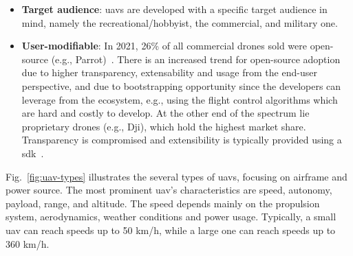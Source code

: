 \begin{itemize}
  fuel, or a hybrid solution. Except for the fuel-only powered ones (e.g., Nitro
  Stingray, and Goliath Quadcopter~\cite{gasPoweredDrone}), all the
  others use electric motors. These motors can be powered through batteries
  (e.g., Parrot\cite{parrotDrone}, Dji Mavic 3~\cite{djiMavic3Drone}),
  typically \gls{lipo}, \glspl{hfc} (e.g., Energyor H2Quad 1000~\cite{energyorDrone}), and solar power. The
  hybrid solutions use fuel + batteries (e.g., Flaperon MX8~\cite{flaperonDrone}) or \gls{hfc} + batteries, and are a compromise between the
  two power sources. Batteries typically have the shortest autonomy and are
  heavy and bulky, while fuel, although not a clean power source, has the
  highest power density, leading to higher autonomy. The hydrogen fuel cells are
  a intermediate solution, but are typically more expensive than batteries and
  have more complex power management.
%  
\item \textbf{Target audience}: \glspl{uav} are developed with a specific target
  audience in mind, namely the recreational/hobbyist, the commercial, and
  military one.
%  
\item \textbf{User-modifiable}: In 2021, 26\% of all commercial drones sold were
  open-source (e.g., Parrot)~\cite{droneAnalyst2021}. There is an increased trend for open-source
  adoption due to higher transparency, extensability and usage from the end-user
  perspective, and due to bootstrapping opportunity since the developers can
  leverage from the ecosystem, e.g., using the flight control algorithms which
  are hard and costly to develop.
  At the other end of the spectrum lie proprietary drones (e.g., Dji), which hold the highest market share.
  Transparency is
  compromised and extensibility is typically provided using a \gls{sdk}~\cite{djiSDK}.
\end{itemize}

Fig.~\ref{fig:uav-types} illustrates the several types of \glspl{uav}, focusing
on airframe and power source. 
The most prominent \gls{uav}'s characteristics are speed, autonomy, payload,
range, and altitude. The speed depends mainly on the propulsion system,
aerodynamics, weather conditions and power usage. Typically, a small
\gls{uav} can reach speeds up to 50 km/h, while a large one can reach speeds up
to 360 km/h\cite{mohsan2022towards}.

